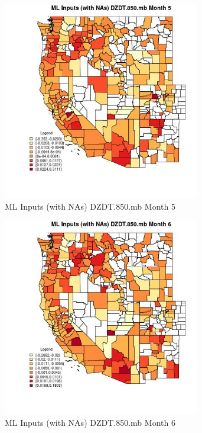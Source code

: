 \begin{figure} 
\centering  
\includegraphics[width=0.77\textwidth]{Code_Outputs/Report_ML_input_PM25_Step4_part_e_de_duplicated_aves_compiled_2019-05-21wNAs_CountyDZDT850mbmedianMonth5.jpg} 
\caption{\label{fig:Report_ML_input_PM25_Step4_part_e_de_duplicated_aves_compiled_2019-05-21wNAsCountyDZDT850mbmedianMonth5}ML Inputs (with NAs) DZDT.850.mb Month 5} 
\end{figure} 
 

\begin{figure} 
\centering  
\includegraphics[width=0.77\textwidth]{Code_Outputs/Report_ML_input_PM25_Step4_part_e_de_duplicated_aves_compiled_2019-05-21wNAs_CountyDZDT850mbmedianMonth6.jpg} 
\caption{\label{fig:Report_ML_input_PM25_Step4_part_e_de_duplicated_aves_compiled_2019-05-21wNAsCountyDZDT850mbmedianMonth6}ML Inputs (with NAs) DZDT.850.mb Month 6} 
\end{figure} 
 

